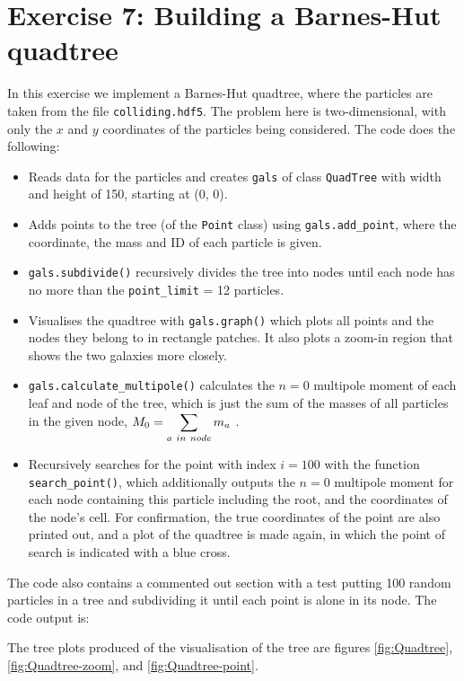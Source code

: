 \documentclass{article}
\begin{document}
\section{Exercise 7: Building a Barnes-Hut quadtree}
In this exercise we implement a Barnes-Hut quadtree,  where the particles are taken from the file \verb+colliding.hdf5+. The problem here is two-dimensional, with only the $x$ and $y$ coordinates of the particles being considered. The code does the following:
\begin{itemize}
    \item Reads data for the particles and creates \verb+gals+ of class \verb+QuadTree+ with width and height of 150, starting at (0, 0). 
    \item Adds points to the tree (of the \verb+Point+ class) using \verb+gals.add_point+, where the coordinate, the mass and ID of each particle is given.
    \item \verb+gals.subdivide()+ recursively divides the tree into nodes until each node has no more than the \verb+point_limit+ = 12 particles.
    \item Visualises the quadtree with \verb+gals.graph()+ which plots all points and the nodes they belong to in rectangle patches. It also plots a zoom-in region that shows the two galaxies more closely.
    \item \verb+gals.calculate_multipole()+ calculates the $n=0$ multipole moment of each leaf and node of the tree, which is just the sum of the masses of all particles in the given node, $M_0 = \scriptscriptstyle\displaystyle\sum_{a\ in\ node}m_a$ . 
    \item Recursively searches for the point with index $i = 100$ with the function \verb+search_point()+, which additionally outputs the $n=0$ multipole moment for each node containing this particle including the root, and the coordinates of the node's cell. For confirmation, the true coordinates of the point are also printed out, and a plot of the quadtree is made again, in which the point of search is indicated with a blue cross. 
\end{itemize}


The code also contains a commented out section with a test putting 100 random particles in a tree and subdividing it until each point is alone in its node. The code output is:


The tree plots produced of the visualisation of the tree are figures \ref{fig:Quadtree}, \ref{fig:Quadtree-zoom}, and \ref{fig:Quadtree-point}.
\end{document}
